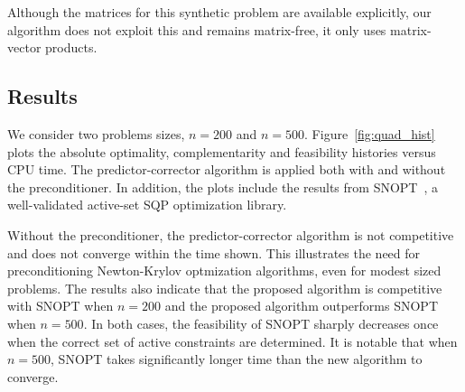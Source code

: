
\begin{remark}
Although the matrices for this synthetic problem are available explicitly, our
algorithm does not exploit this and remains matrix-free, \ie it only uses
matrix-vector products.
\end{remark}

\subsection{Results}
We consider two problems sizes, $n=200$ and $n=500$. Figure~\ref{fig:quad_hist} plots the absolute optimality, complementarity and feasibility
histories versus CPU time. 
The predictor-corrector algorithm is applied both with and without the preconditioner.  
In addition, the plots include the results
from SNOPT~\cite{gill:2002}, a well-validated active-set SQP
optimization library.

Without the preconditioner, the predictor-corrector algorithm is not competitive
and does not converge within the time shown.  This illustrates the need for preconditioning Newton-Krylov
optmization algorithms, even for modest sized problems.  The results
also indicate that the proposed algorithm is competitive with SNOPT when $n=200$ and the proposed algorithm outperforms SNOPT when $n=500$. In both cases, the feasibility of SNOPT sharply 
decreases once when the correct set of active constraints are determined. It is notable that when  $n=500$, SNOPT takes significantly longer time than the new algorithm to converge. 

